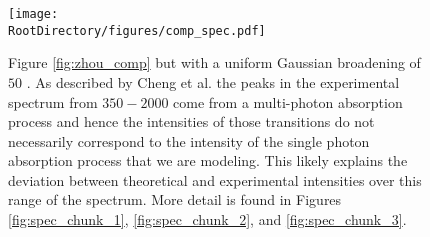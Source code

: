 \begin{figure}[ht]
\begin{center}
    \texttt{[image: \\RootDirectory/figures/comp\_spec.pdf]}
    \caption{
    Figure \ref{fig:zhou_comp} but with a uniform Gaussian broadening of $50$ \wavenumbers{}. As described by Cheng et al.\cite{Cheng2012} the peaks in the experimental spectrum from \squigg$350-2000$ \wavenumbers{} come from a multi-photon absorption process and hence the intensities of those transitions do not necessarily correspond to the intensity of the single photon absorption process that we are modeling. This likely explains the deviation between theoretical and experimental intensities over this range of the spectrum. More detail is found in Figures \ref{fig:spec_chunk_1}, \ref{fig:spec_chunk_2}, and \ref{fig:spec_chunk_3}.
}
\label{fig:spec}
\end{center}
\end{figure}
